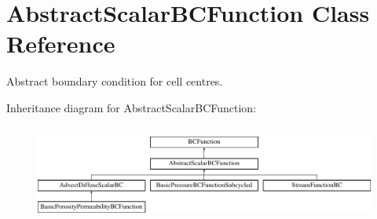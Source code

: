 \hypertarget{class_abstract_scalar_b_c_function}{}\section{Abstract\+Scalar\+B\+C\+Function Class Reference}
\label{class_abstract_scalar_b_c_function}


Abstract boundary condition for cell centres.  


Inheritance diagram for Abstract\+Scalar\+B\+C\+Function\+:\begin{figure}[H]
\begin{center}
\leavevmode
\includegraphics[height=3.218391cm]{class_abstract_scalar_b_c_function}
\end{center}
\end{figure}
